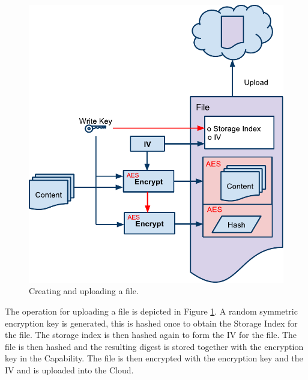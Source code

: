 \documentclass[pdftex,english,10pt,b5paper,twoside]{book}
\begin{document}
\begin{figure}[h!]
    \centering
    \includegraphics[width=\columnwidth]{CryptoCreateFile.pdf}
    \caption{Creating and uploading a file. }
    \label{fig:CS:CF}
\end{figure}

The operation for uploading a file is depicted in Figure \ref{fig:CS:CF}. A
random symmetric encryption key is generated, this is hashed once to obtain the
Storage Index for the file. The storage index is then hashed again to form the
\ac{IV} for the file. The file is then hashed and the resulting digest is
stored together with the encryption key in the Capability. The file is then
encrypted with the encryption key and the \ac{IV} and is uploaded into the
Cloud.
\end{document}
